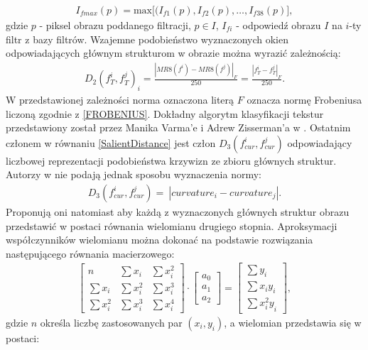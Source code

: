 \documentclass[a4paper,12pt,twoside,openany]{report}
\begin{document}
\begin{align}
I_{fmax}(p)=\mathrm{max}\big[(I_{f1}(p),I_{f2}(p),\dots ,I_{f38}(p) \big],
\end{align}
gdzie $p$ - piksel obrazu poddanego filtracji, $p\in I$, $I_{fi}$ - odpowiedź obrazu $I$ na $i$-ty filtr z bazy filtrów. Wzajemne podobieństwo wyznaczonych okien odpowiadających głównym strukturom w obrazie można wyrazić zależnością:
\begin{align}
D_2{\left(f^i_T,f^j_T\right)}_i=\frac{{\left|MR8\left(f^i\right)-MR8\left(f^j\right)\right|}_F}{250}=\frac{{\left|f^i_T-f^j_T\right|}_F}{250}.
\end{align}
W przedstawionej zależności norma oznaczona literą $F$ oznacza normę Frobeniusa liczoną zgodnie z \eqref{FROBENIUS}.
Dokładny algorytm klasyfikacji tekstur przedstawiony został przez Manika Varma'e i Adrew Zisserman'a w \cite{varma2009statistical}. Ostatnim członem w równaniu \eqref{SalientDistance} jest człon $D_3\left(f^i_{cur},f^j_{cur}\right)$ odpowiadający liczbowej reprezentacji podobieństwa krzywizn ze zbioru głównych struktur. Autorzy w \cite{SalientStrucTexProp} nie podają jednak sposobu wyznaczenia normy:
\begin{align}
D_3\left(f^i_{cur},f^j_{cur}\right)=\ \left|curvature_i-curvature_j\right|.
\end{align}
Proponują oni natomiast aby każdą z wyznaczonych głównych struktur obrazu przedstawić w postaci równania wielomianu drugiego stopnia. Aproksymacji współczynników wielomianu można dokonać na podstawie rozwiązania następującego równania macierzowego:
\begin{align}
\left[ \begin{array}{ccc}
n & \sum{x_i} & \sum{x^2_i} \\ 
\sum{x_i} & \sum{x^2_i} & \sum{x^3_i} \\ 
\sum{x^2_i} & \sum{x^3_i} & \sum{x^4_i} \end{array}
\right]\cdot \left[ \begin{array}{c}
a_0 \\ 
a_1 \\ 
a_2 \end{array}
\right]=\left[ \begin{array}{c}
\sum{y_i} \\ 
\sum{x_iy_i} \\ 
\sum{{x^2_iy}_i} \end{array}
\right],
\end{align}
gdzie $n$ określa liczbę zastosowanych par $(x_i,y_i)$, a wielomian przedstawia się w postaci:
\end{document}
